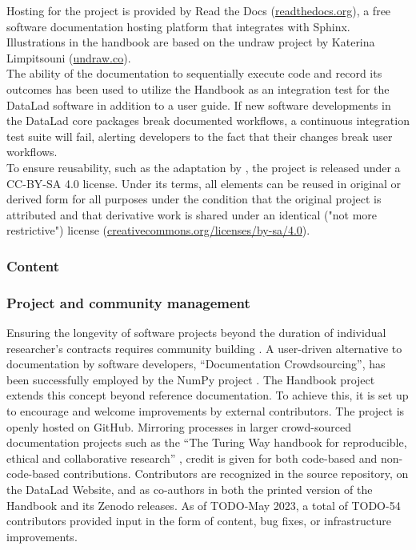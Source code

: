 Hosting for the project is provided by Read the Docs (\href{https://readthedocs.org/}{readthedocs.org}), a free software documentation hosting platform that integrates with Sphinx.
Illustrations in the handbook are based on the undraw project by Katerina Limpitsouni (\href{https://undraw.co/}{undraw.co}). \\
The ability of the documentation to sequentially execute code and record its outcomes has been used to utilize the Handbook as an integration test for the DataLad software in addition to a user guide.
If new software developments in the DataLad core packages break documented workflows, a continuous integration test suite will fail, alerting developers to the fact that their changes break user workflows. \\
To ensure reusability, such as the adaptation by \citet{brooks2021handbook}, the project is released under a CC-BY-SA 4.0 license.
Under its terms, all elements can be reused in original or derived form for all purposes under the condition that the original project is attributed and that derivative work is shared under an identical ("not more restrictive") license (\href{https://creativecommons.org/licenses/by-sa/4.0/}{creativecommons.org/licenses/by-sa/4.0}).

\subsubsection{Content}



\subsubsection{Project and community management}

Ensuring the longevity of software projects beyond the duration of individual researcher's contracts requires community building \citep{koehler2020better}.
A user-driven alternative to documentation by software developers, ``Documentation Crowdsourcing'', has been successfully employed by the NumPy project \citep{pawlik2014crowdsourcing}.
The Handbook project extends this concept beyond reference documentation.
To achieve this, it is set up to encourage and welcome improvements by external contributors.
The project is openly hosted on GitHub.
Mirroring processes in larger crowd-sourced documentation projects such as the ``The Turing Way handbook for reproducible, ethical and collaborative research'' \citep{the_turing_way_community_2022_7625728}, credit is given for both code-based and non-code-based contributions.
Contributors are recognized in the source repository, on the DataLad Website, and as co-authors in both the printed version of the Handbook and its Zenodo releases.
As of TODO-May 2023, a total of TODO-54 contributors provided input in the form of content, bug fixes, or infrastructure improvements.


